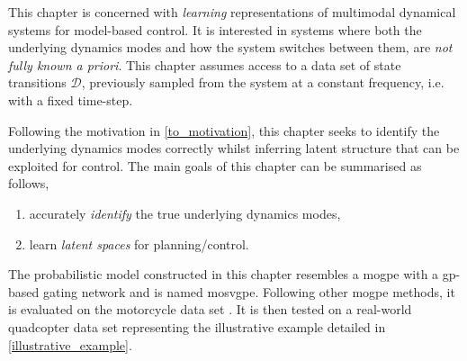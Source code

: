 \documentclass{mimosis-class/mimosis}
\numberwithin{equation}{chapter}
\newcommand{\modeInd}{\ensuremath{k}}
\newcommand{\ModeInd}{\ensuremath{\MakeUppercase{\modeInd}}}
\newcommand{\dataset}{\ensuremath{\mathcal{D}}}
\begin{document}
\newcommand{\expertKL}{\ensuremath{\text{KL}\left( \expertInducingVariational \mid\mid \expertInducingPrior \right)}}
\newcommand{\expertsKL}{\ensuremath{\sum_{\modeInd=1}^\ModeInd\text{KL}\left( \expertInducingVariational \mid\mid \expertInducingPrior \right)}}
\newcommand{\gatingKL}{\ensuremath{\text{KL}\left( \gatingInducingVariational \mid\mid \gatingInducingPrior \right)}}
\newcommand{\gatingsKL}{\ensuremath{\sum_{\modeInd=1}^\ModeInd \text{KL}\left( \gatingInducingVariational \mid\mid \gatingInducingPrior \right)}}
This chapter is concerned with \emph{learning} representations of multimodal dynamical systems for model-based control.
It is interested in systems where both the underlying
dynamics modes and how the system switches between them, are \emph{not fully known a priori}.
This chapter assumes access to a data set of state transitions \(\dataset\),
previously sampled from the system at a constant frequency, i.e. with a fixed time-step.

Following the motivation in \cref{to_motivation}, this chapter
seeks to identify the underlying dynamics modes correctly whilst inferring
latent structure that can be exploited for control.
The main goals of this chapter can be summarised as follows,
\begin{enumerate}
\item accurately \emph{identify} the true underlying dynamics modes,
\item learn \emph{latent spaces} for planning/control.
\end{enumerate}
The probabilistic model constructed in this chapter
resembles a \acrfull{mogpe} with a \acrshort{gp}-based gating network and  is named \acrfull{mosvgpe}.
Following other \acrshort{mogpe} methods, it is evaluated on the motorcycle data set \citep{Silverman1985}.
It is then tested on a real-world quadcopter data set representing the illustrative
example detailed in \cref{illustrative_example}.
\end{document}
